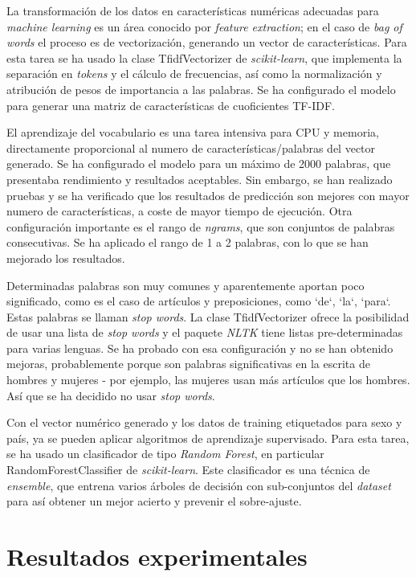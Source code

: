 \documentclass[11pt,a4paper]{article}
\begin{document}
  La transformaci\'on de los datos en caracter\'isticas num\'ericas adecuadas para {\em machine learning} es un \'area conocido por {\em feature extraction}; en el caso de {\em bag of words} el proceso es de vectorizaci\'on, generando un vector de caracter\'isticas. Para esta tarea se ha usado la clase {\ttfamily TfidfVectorizer} de {\em scikit-learn}, que implementa la separaci\'on en {\em tokens} y el c\'alculo de frecuencias, así como la normalizaci\'on y atribuci\'on de pesos de importancia a las palabras. Se ha configurado el modelo para generar una matriz de caracter\'isticas de cuoficientes TF-IDF.

  El aprendizaje del vocabulario es una tarea intensiva para CPU y memoria, directamente proporcional al numero de caracter\'isticas/palabras del vector generado. Se ha configurado el modelo para un m\'aximo de 2000 palabras, que presentaba rendimiento y resultados aceptables. Sin embargo, se han realizado pruebas y se ha verificado que los resultados de predicci\'on son mejores con mayor numero de caracter\'isticas, a coste de mayor tiempo de ejecuci\'on. Otra configuraci\'on importante es el rango de {\em ngrams}, que son conjuntos de palabras consecutivas. Se ha aplicado el rango de 1 a 2 palabras, con lo que se han mejorado los resultados.

  Determinadas palabras son muy comunes y aparentemente aportan poco significado, como es el caso de art\'iculos y preposiciones, como `de`, `la`, `para`. Estas palabras se llaman {\em stop words}. La clase {\ttfamily TfidfVectorizer} ofrece la posibilidad de usar una lista de {\em stop words} y el paquete {\em NLTK} tiene listas pre-determinadas para varias lenguas.  Se ha probado con esa configuraci\'on y no se han obtenido mejoras, probablemente porque son palabras significativas en la escrita de hombres y mujeres - por ejemplo, las mujeres usan m\'as art\'iculos que los hombres. As\'i que se ha decidido no usar {\em stop words}.

  Con el vector num\'erico generado y los datos de training etiquetados para sexo y pa\'is, ya se pueden aplicar algoritmos de aprendizaje supervisado. Para esta tarea, se ha usado un clasificador de tipo {\em Random Forest}, en particular {\ttfamily RandomForestClassifier} de {\em scikit-learn}. Este clasificador es una t\'ecnica de {\em ensemble}, que entrena varios \'arboles de decisi\'on con sub-conjuntos del {\em dataset} para as\'i obtener un mejor acierto y prevenir el sobre-ajuste.


\section{Resultados experimentales}
\end{document}
